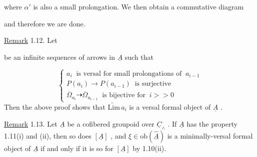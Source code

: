 \begin{center}
\end{center}
where  $\alpha'$  is also a small prolongation. We then obtain a commutative diagram

\begin{center}
\end{center}
and therefore we are done.

\underline{Remark} 1.12.  Let
be an infinite sequences of arrows in  $\underline{A}$  such that

\begin{equation*}
\left\{\begin{array}{l}
a_i \ \text{ is versal for small prolongations of } \ a_{i-1} \\[2pt]
P(a_i) \longrightarrow P(a_{i-1}) \ \text{ is surjective} \\[2pt]
\overline{\Omega}_{a_i} \dashrightarrow \overline{\Omega}_{a_{i-1}} \ \text{ is bijective for } \ i >> 0
\end{array}\right.
\end{equation*}
Then the above proof shows that  $\underleftarrow{\mathrm{Lim}}\, a_i$  is a versal formal object of  $\underline{A}$  .

\underline{Remark} 1.13.  Let  $\underline{A}$  be a cofibered groupoid over  $\underline{C}_\wedge$  . If  $\underline{A}$  has the property 1.11(i) and (ii), then so does  $[\underline{A}]$  , and  $\xi \in \mathrm{ob}(\hat{\underline{A}})$  is a minimally-versal formal object of  $\underline{A}$  if and only if it is so for  $[\underline{A}]$  by 1.10(ii).

